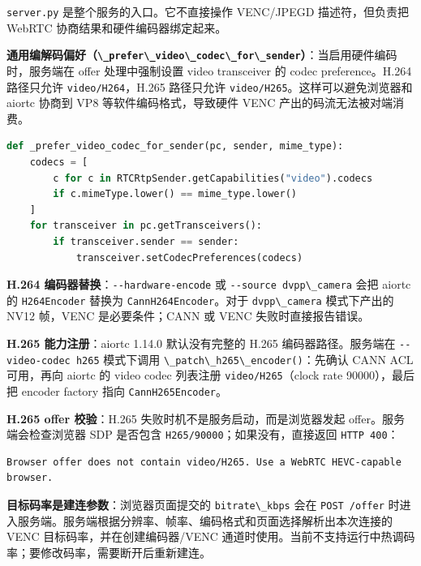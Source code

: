 \passthrough{\lstinline!server.py!} 是整个服务的入口。它不直接操作
VENC/JPEGD 描述符，但负责把 WebRTC 协商结果和硬件编码器绑定起来。

\textbf{通用编解码偏好（\passthrough{\lstinline!\_prefer\_video\_codec\_for\_sender!}）}：当启用硬件编码时，服务端在
offer 处理中强制设置 video transceiver 的 codec preference。H.264
路径只允许 \passthrough{\lstinline!video/H264!}，H.265 路径只允许
\passthrough{\lstinline!video/H265!}。这样可以避免浏览器和 aiortc 协商到
VP8 等软件编码格式，导致硬件 VENC 产出的码流无法被对端消费。

\begin{lstlisting}[language=Python]
def _prefer_video_codec_for_sender(pc, sender, mime_type):
    codecs = [
        c for c in RTCRtpSender.getCapabilities("video").codecs
        if c.mimeType.lower() == mime_type.lower()
    ]
    for transceiver in pc.getTransceivers():
        if transceiver.sender == sender:
            transceiver.setCodecPreferences(codecs)
\end{lstlisting}

\textbf{H.264 编码器替换}：\passthrough{\lstinline!--hardware-encode!}
或 \passthrough{\lstinline!--source dvpp\_camera!} 会把 aiortc 的
\passthrough{\lstinline!H264Encoder!} 替换为
\passthrough{\lstinline!CannH264Encoder!}。对于
\passthrough{\lstinline!dvpp\_camera!} 模式下产出的 NV12 帧，VENC
是必要条件；CANN 或 VENC 失败时直接报告错误。

\textbf{H.265 能力注册}：aiortc 1.14.0 默认没有完整的 H.265
编码器路径。服务端在 \passthrough{\lstinline!--video-codec h265!}
模式下调用 \passthrough{\lstinline!\_patch\_h265\_encoder()!}：先确认
CANN ACL 可用，再向 aiortc 的 video codec 列表注册
\passthrough{\lstinline!video/H265!}（clock rate 90000），最后把 encoder
factory 指向 \passthrough{\lstinline!CannH265Encoder!}。

\textbf{H.265 offer 校验}：H.265 失败时机不是服务启动，而是浏览器发起
offer。服务端会检查浏览器 SDP 是否包含
\passthrough{\lstinline!H265/90000!}；如果没有，直接返回
\passthrough{\lstinline!HTTP 400!}：

\begin{lstlisting}
Browser offer does not contain video/H265. Use a WebRTC HEVC-capable browser.
\end{lstlisting}

\textbf{目标码率是建连参数}：浏览器页面提交的
\passthrough{\lstinline!bitrate\_kbps!} 会在
\passthrough{\lstinline!POST /offer!}
时进入服务端。服务端根据分辨率、帧率、编码格式和页面选择解析出本次连接的
VENC 目标码率，并在创建编码器/VENC
通道时使用。当前不支持运行中热调码率；要修改码率，需要断开后重新建连。

